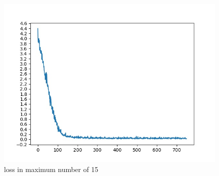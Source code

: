 \documentclass[journal, a4paper]{IEEEtran}
\begin{document}
		\begin{figure}
		\begin{center}
		\includegraphics[width=\columnwidth]{images/loss2.jpg}
		\caption{loss in maximum number of 15}
		\label{fig:loss2}
		\end{center}
	\end{figure}
	
\end{document}
